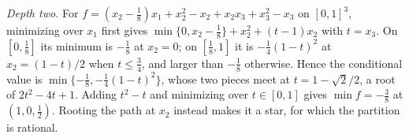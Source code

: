\emph{Depth two.} For $f=(x_2-\tfrac18)x_1+x_2^2-x_2+x_2x_3+x_3^2-x_3$ on
$[0,1]^3$, minimizing over $x_1$ first gives
$\min\{0,x_2-\tfrac18\}+x_2^2+(t-1)x_2$ with $t=x_3$. On $[0,\tfrac18]$ its
minimum is $-\tfrac18$ at $x_2=0$; on $[\tfrac18,1]$ it is $-\tfrac14(1-t)^2$ at
$x_2=(1-t)/2$ when $t\le\tfrac34$, and larger than $-\tfrac18$ otherwise. Hence the
conditional value is $\min\{-\tfrac18,-\tfrac14(1-t)^2\}$, whose two pieces meet
at $t=1-\sqrt2/2$, a root of $2t^2-4t+1$. Adding $t^2-t$ and minimizing over
$t\in[0,1]$ gives $\min f=-\tfrac38$ at $(1,0,\tfrac12)$. Rooting the path at
$x_2$ instead makes it a star, for which the partition is rational.
